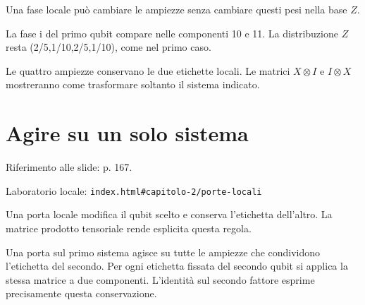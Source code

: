 \label{c2-tensore-example-2-step-4}


Una fase locale può cambiare le ampiezze senza cambiare questi pesi nella base \(Z\).\par



La fase i del primo qubit compare nelle componenti 10 e 11. La distribuzione \(Z\) resta (2/5,1/10,2/5,1/10), come nel primo caso.\par


Le quattro ampiezze conservano le due etichette locali. Le matrici \(X\otimes I\) e \(I\otimes X\) mostreranno come trasformare soltanto il sistema indicato.\par


\Needspace{.43\textheight}
\section{Agire su un solo sistema}
\label{c2-porte-locali}

{\sffamily\small\color{Ink!70} Riferimento alle slide: p. 167.\par}

{\sffamily\small\color{Ink!70} Laboratorio locale: \nolinkurl{index.html#capitolo-2/porte-locali}\par}

Una porta locale modifica il qubit scelto e conserva l'etichetta dell'altro. La matrice prodotto tensoriale rende esplicita questa regola.\par

Una porta sul primo sistema agisce su tutte le ampiezze che condividono l'etichetta del secondo. Per ogni etichetta fissata del secondo qubit si applica la stessa matrice a due componenti. L'identità sul secondo fattore esprime precisamente questa conservazione.\par

